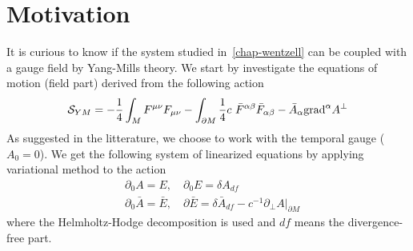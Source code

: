 \section{Motivation}
It is curious to know if the system studied in~\cref{chap-wentzell} can be coupled with a gauge field by Yang-Mills theory. 
We start by investigate the equations of motion (field part) derived from the following action
\begin{equation*}
\mathcal{S}_{YM} = -\frac 1 4 \int_M F^{\mu\nu} F_{\mu\nu} 
-\int_{\partial M} \frac 1 4 c\ \bar{F}^{\alpha\beta} \bar{F}_{\alpha\beta} - \bar{A}_\alpha \mathrm{grad}^\alpha A^{\bot} 
\end{equation*}
As suggested in the litterature, 
we choose to work with the temporal gauge ($A_0 = 0$). 
We get the following system of linearized equations by applying variational method to the action
\begin{equation}
\begin{split}
& \partial_0 A = E, \quad \partial_0 E = \delta A_{df} \\
& \partial_0 \bar{A} = \bar{E} , \quad \partial \bar{E} = \delta \bar{A}_{df} - c^{-1}\partial_\bot A\vert_{\partial M}
\end{split}
\end{equation}
where the Helmholtz-Hodge decomposition is used and $df$ means the divergence-free part.
